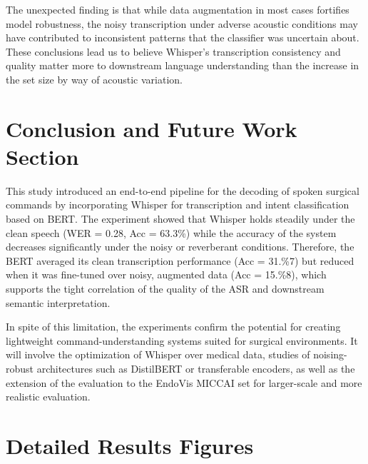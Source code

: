 \documentclass[11pt,a4paper]{article}
\begin{document}
The unexpected finding is that while data augmentation in most cases fortifies model robustness, the noisy transcription under adverse acoustic conditions may have contributed to inconsistent patterns that the classifier was uncertain about. These conclusions lead us to believe Whisper's transcription consistency and quality matter more to downstream language understanding than the increase in the set size by way of acoustic variation.


\section{Conclusion and Future Work Section}
This study introduced an end-to-end pipeline for the decoding of spoken surgical commands by incorporating Whisper for transcription and intent classification based on BERT.
The experiment showed that Whisper holds steadily under the clean speech (WER = 0.28, Acc = 63.3\%) while the accuracy of the system decreases significantly under the noisy or reverberant conditions.
Therefore, the BERT averaged its clean transcription performance (Acc = 31.\%7) but reduced when it was fine-tuned over noisy, augmented data (Acc = 15.\%8), which supports the tight correlation of the quality of the ASR and downstream semantic interpretation.

In spite of this limitation, the experiments confirm the potential for creating lightweight command-understanding systems suited for surgical environments. It will involve the optimization of Whisper over medical data, studies of noising-robust architectures such as DistilBERT or transferable encoders, as well as the extension of the evaluation to the EndoVis MICCAI set for larger-scale and more realistic evaluation.










\appendix


\section{Detailed Results Figures}
\end{document}
